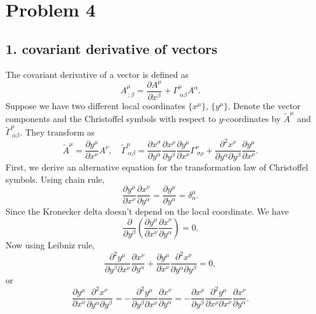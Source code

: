 \documentclass{article}
\begin{document}
\section*{Problem 4}
\subsection*{1. covariant derivative of vectors}
The covariant derivative of a vector is defined as 
\begin{equation}
A^\mu_{~;\beta} = \frac{\partial A^\mu}{\partial x^\beta}+\Gamma^\mu_{~\alpha \beta}A^\alpha.
\end{equation}
Suppose we have two different local coordinates $\{x^\mu\}$, $\{y^\mu\}$. Denote the vector components and the Christoffel symbols with respect to $y$-coordinates by $\widetilde{A}^\mu$ and $\widetilde{\Gamma}^\mu_{~\alpha \beta}$. They transform as
\begin{equation}
\widetilde{A}^\mu = \frac{\partial y^\mu}{\partial x^\nu} A^\nu,\quad
\widetilde{\Gamma}^\mu_{~\alpha\beta} = \frac{\partial x^\sigma}{\partial y^\alpha}\frac{\partial x^\rho}{\partial y^\beta} \frac{\partial y^\mu}{\partial x^\nu}\Gamma^\nu_{~\sigma \rho}
+\frac{\partial^2 x^\nu}{\partial y^\alpha \partial y^\beta} \frac{\partial y^\mu}{\partial x^\nu}.
\end{equation}
First, we derive an alternative equation for the transformation law of Christoffel symbols. Using chain rule,
\begin{equation}
\frac{\partial y^\mu}{\partial x^\nu}\frac{\partial x^\nu}{\partial y^\alpha} = \frac{\partial y^\mu}{\partial y^\alpha}= \delta^\mu_\alpha.
\end{equation}
Since the Kronecker delta doesn't depend on the local coordinate.
We have
\begin{equation}
\frac{\partial}{\partial y^\beta}\left(\frac{\partial y^\mu}{\partial x^\nu}\frac{\partial x^\nu}{\partial y^\alpha} \right)=0.
\end{equation}
Now using Leibniz rule,
\begin{equation}
\frac{\partial^2 y^\mu}{\partial y^\beta\partial x^\nu}\frac{\partial x^\nu}{\partial y^\alpha}
+ \frac{\partial y^\mu}{\partial x^\nu}\frac{\partial^2 x^\nu}{\partial y^\alpha \partial y^\beta}=0,
\end{equation}
or 
\begin{equation}
\frac{\partial y^\mu}{\partial x^\nu}\frac{\partial^2 x^\nu}{\partial y^\alpha \partial y^\beta}=
-\frac{\partial^2 y^\mu}{\partial y^\beta\partial x^\nu}\frac{\partial x^\nu}{\partial y^\alpha}=-\frac{\partial x^\rho}{\partial y^\beta}\frac{\partial^2 y^\mu}{\partial x^\rho\partial x^\nu}\frac{\partial x^\nu}{\partial y^\alpha}.
\end{equation}
\end{document}
